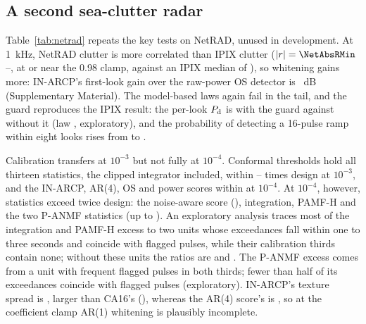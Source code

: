 \documentclass[journal]{IEEEtran}
\begin{document}
\subsection{A second sea-clutter radar}\label{sec:netrad}
\begin{table}[!t]
\centering\footnotesize
\caption{IPIX and NetRAD S-band sea clutter, same code and settings except the ANMF secondary cells (Section~\ref{sec:design}). Entries: $P_{\rm fa}/\alpha$ at $\alpha=0.01$ unless stated; guard row: per-look $P_{\rm d}$ at 10~dB, mean over looks 1--8; $P_{\rm d}$ in parentheses at 10~dB. Conformal rows: the 12 statistics other than the clipped integrator (conservative on IPIX). Injected interference 30~dB above the local power. Flagged pulses: NetRAD HH, certificate calibrated on their masks.}
\label{tab:netrad}
\setlength{\tabcolsep}{3pt}

\end{table}
Table~\ref{tab:netrad} repeats the key tests on NetRAD, unused in development. At 1~kHz, NetRAD clutter is more correlated than IPIX clutter ($|r|=\NetAbsRMin$--\NetAbsRMax, at or near the 0.98 clamp, against an IPIX median of \IpixAbsRMed), so whitening gains more: IN-ARCP's first-look gain over the raw-power OS detector is \NetOSGain~dB (Supplementary Material). The model-based laws again fail in the tail, and the guard reproduces the IPIX result: the per-look $P_{\rm d}$ is \NetGuardEight{} with the guard against \NetGuardZero{} without it (law \NetLawEight, exploratory), and the probability of detecting a 16-pulse ramp within eight looks rises from \NetRampZero{} to \NetRampEight.

Calibration transfers at $10^{-3}$ but not fully at $10^{-4}$. Conformal thresholds hold all thirteen statistics, the clipped integrator included, within \NetConfMinThree--\NetConfMaxThree{} times design at $10^{-3}$, and the IN-ARCP, AR(4), OS and power scores within \NetPerLookMax{} at $10^{-4}$. At $10^{-4}$, however, \NetNOverTwoFourWord{} statistics exceed twice design: the noise-aware score (\NetNaFour), integration, PAMF-H and the two P-ANMF statistics (up to \NetDwellMax). An exploratory analysis traces most of the integration and PAMF-H excess to two units whose exceedances fall within one to three seconds and coincide with flagged pulses, while their calibration thirds contain none; without these units the ratios are \NetAttrDin{} and \NetAttrPamf. The P-ANMF excess comes from a unit with frequent flagged pulses in both thirds; fewer than half of its exceedances coincide with flagged pulses (exploratory). IN-ARCP's texture spread is \NetSpreadIn, larger than CA16's (\NetSpreadCa), whereas the AR(4) score's is \NetSpreadInFour, so at the coefficient clamp AR(1) whitening is plausibly incomplete.
\end{document}
